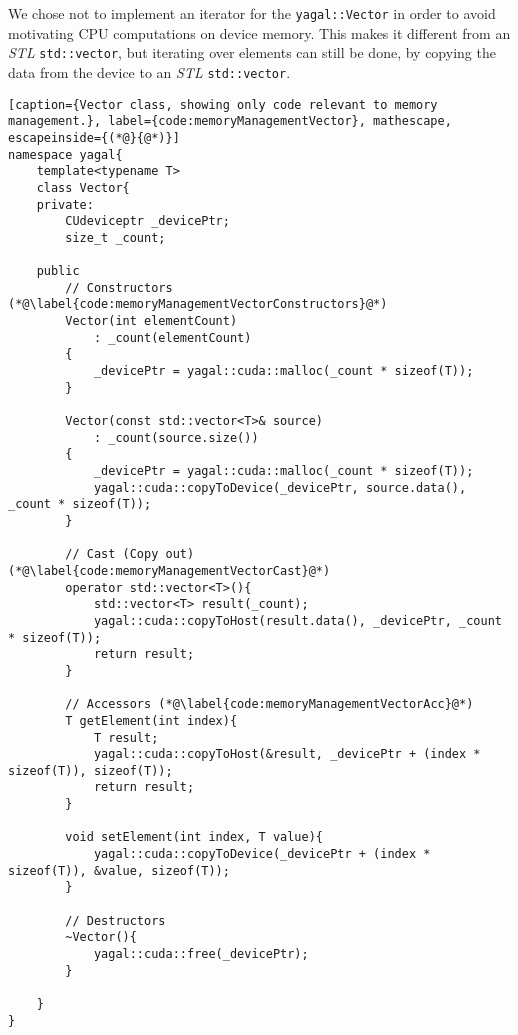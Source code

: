 We chose not to implement an iterator for the \texttt{yagal::Vector} in order to avoid motivating CPU computations on device memory. This makes it different from an \textit{STL} \texttt{std::vector}, but iterating over elements can still be done, by copying the data from the device to an \textit{STL} \texttt{std::vector}.



\begin{lstlisting}[caption={Vector class, showing only code relevant to memory management.}, label={code:memoryManagementVector}, mathescape, escapeinside={(*@}{@*)}]
namespace yagal{
    template<typename T>
    class Vector{
    private:
        CUdeviceptr _devicePtr;
        size_t _count;

    public
        // Constructors (*@\label{code:memoryManagementVectorConstructors}@*)
        Vector(int elementCount)
            : _count(elementCount)
        {
            _devicePtr = yagal::cuda::malloc(_count * sizeof(T));
        }

        Vector(const std::vector<T>& source)
            : _count(source.size())
        {
            _devicePtr = yagal::cuda::malloc(_count * sizeof(T));
            yagal::cuda::copyToDevice(_devicePtr, source.data(), _count * sizeof(T));
        }

        // Cast (Copy out) (*@\label{code:memoryManagementVectorCast}@*)
        operator std::vector<T>(){
            std::vector<T> result(_count);
            yagal::cuda::copyToHost(result.data(), _devicePtr, _count * sizeof(T));
            return result;
        }

        // Accessors (*@\label{code:memoryManagementVectorAcc}@*)
        T getElement(int index){
            T result;
            yagal::cuda::copyToHost(&result, _devicePtr + (index * sizeof(T)), sizeof(T));
            return result;
        }

        void setElement(int index, T value){
            yagal::cuda::copyToDevice(_devicePtr + (index * sizeof(T)), &value, sizeof(T));
        }

        // Destructors
        ~Vector(){
            yagal::cuda::free(_devicePtr);
        }

    }
}
\end{lstlisting}
